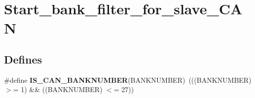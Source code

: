 \hypertarget{group__Start__bank__filter__for__slave__CAN}{
\section{Start\_\-bank\_\-filter\_\-for\_\-slave\_\-CAN}
\label{group__Start__bank__filter__for__slave__CAN}
}
\subsection*{Defines}
\begin{DoxyCompactItemize}
\item 
\hypertarget{group__Start__bank__filter__for__slave__CAN_ga7fb463088ff4cd584bba47e3d0a4f469}{
\#define {\bfseries IS\_\-CAN\_\-BANKNUMBER}(BANKNUMBER)~(((BANKNUMBER) $>$= 1) \&\& ((BANKNUMBER) $<$= 27))}
\label{group__Start__bank__filter__for__slave__CAN_ga7fb463088ff4cd584bba47e3d0a4f469}

\end{DoxyCompactItemize}
